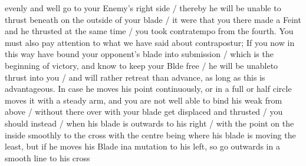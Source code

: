 \newpage


\newpage


evenly and well go to your Enemy's right side / thereby he will be
unable to thrust beneath on the outside of your blade / it were that
you there made a Feint and he thrusted at the same time / you took
contratempo from the fourth. You must also pay attention to what we
have said about contrapostur; If you now in this way have bound your
opponent's blade into submission / which is the beginning of victory,
and know to keep your Blde free / he will be unableto thrust into you
/ and will rather retreat than advance, as long as this is
advantageous. In case he moves his point continuously, or in a full or
half circle moves it with a steady arm,
and you are not well able to bind his weak from above / without there
over with your blade get displaced and thrusted / you should instead /
when his blade is outwards to his right / with the point on the inside
smoothly to the cross with the centre being where his blade is moving
the least, but if he moves his Blade ina mutation to his left, so go
outwards in a smooth line to his cross
